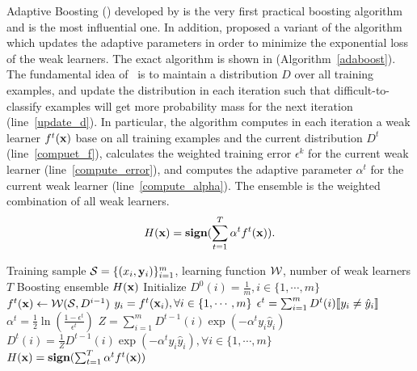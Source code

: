 {Adaptive Boosting (\adaboost) developed by \citet{Freund97a} is the very first practical boosting algorithm and is the most influential one.
In addition, \citet{Schapire99improved} proposed a variant of the algorithm which updates the adaptive parameters in order to minimize the exponential loss of the weak learners.
The exact algorithm is shown in (Algorithm~\ref{adaboost}).
The fundamental idea of \adaboost\ is to maintain a distribution $D$ over all training examples, and update the distribution in each iteration such that difficult-to-classify examples will get more probability mass for the next iteration (line~\ref{update_d}).
In particular, the algorithm computes in each iteration a weak learner $f^t(\mathbf {x})$ base on all training examples and the current distribution $D^{t}$ (line~\ref{compuet_f}), calculates the weighted training error $\epsilon^k$ for the current weak learner (line~\ref{compute_error}), and computes the adaptive parameter $\alpha^t$ for the current weak learner (line~\ref{compute_alpha}).
The ensemble is the weighted combination of all weak learners.
\begin{align*}
	H(\mathbf {x}) = \textbf{sign}(\sum_{t=1}^T\alpha^tf^t(\mathbf {x})).
\end{align*}
\begin{algorithm}
\caption{\adaboost}
\label{adaboost}
\begin{algorithmic}[1]
	\REQUIRE Training sample $\mathcal{S} = \{(x_i,\mathbf {y}_i)\}_{i=1}^m$, learning function $\mathcal{W}$, number of weak learners $T$
	\ENSURE Boosting ensemble $H(\mathbf {x})$
	\STATE Initialize $D^0(i)=\frac{1}{m},i\in\{1,\cdots,m\}$
		\STATE $f^t(\mathbf {x})\leftarrow\mathcal{W}(\mathcal{S},D^{i-1})$ \label{compuet_f}
		\STATE $y_i = f^t(\mathbf {x}_i),\forall i\in\{1,\cdots,m\}$
		\STATE $\epsilon^t = \sum_{i=1}^{m}D^t(i){\llbracket y_i\neq\hat{y}_i \rrbracket}$ \label{compute_error}
		\STATE $\alpha^{t} = \frac{1}{2}\ln\left(\frac{1-\epsilon^t}{\epsilon^t}\right)$ \label{compute_alpha}
		\STATE $Z=\sum_{i=1}^{m}D^{t-1}(i)\exp(-\alpha^ty_i\hat{y}_i)$
		\STATE $D^t(i) = \frac{1}{Z}D^{t-1}(i)\exp(-\alpha^ty_i\hat{y}_i),\forall i\in\{1,\cdots,m\}$ \label{update_d}
	\ENDFOR
	\RETURN $H(\mathbf {x}) = \textbf{sign}(\sum_{t=1}^T\alpha^tf^t(\mathbf {x}))$
\end{algorithmic}
\end{algorithm}

}
